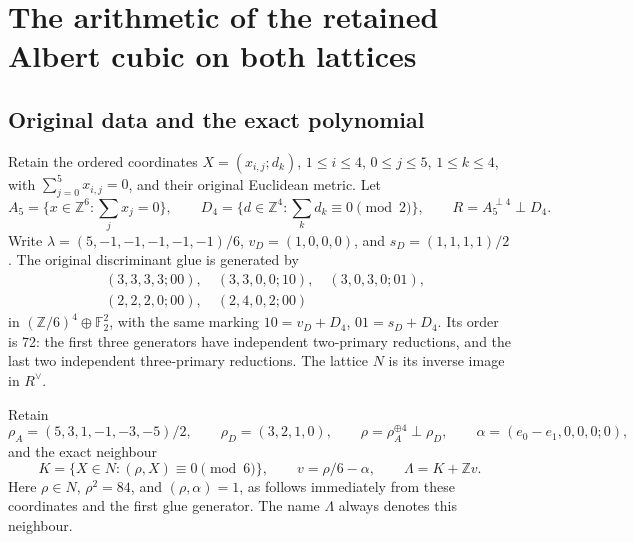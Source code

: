 \section{The arithmetic of the retained Albert cubic on both lattices}
\label{nca:sec:cubic-arithmetic}

\subsection{Original data and the exact polynomial}

Retain the ordered coordinates \(X=(x_{i,j};d_k)\),
\(1\leq i\leq4\), \(0\leq j\leq5\), \(1\leq k\leq4\), with
\(\sum_{j=0}^5x_{i,j}=0\), and their original Euclidean metric.
Let
\[
 A_5=\{x\in\mathbb Z^6:\sum_jx_j=0\},\qquad
 D_4=\{d\in\mathbb Z^4:\sum_kd_k\equiv0\pmod2\},\qquad
 R=A_5^{\perp4}\perp D_4.
\]
Write \(\lambda=(5,-1,-1,-1,-1,-1)/6\),
\(v_D=(1,0,0,0)\), and \(s_D=(1,1,1,1)/2\).
The original discriminant glue is generated by
\[
 \begin{split}
 &(3,3,3,3;00),\quad(3,3,0,0;10),\quad(3,0,3,0;01),\\
 &(2,2,2,0;00),\quad(2,4,0,2;00)
 \end{split}
\]
in \((\mathbb Z/6)^4\oplus\mathbb F_2^2\), with the same marking
\(10=v_D+D_4\), \(01=s_D+D_4\). Its order is 72: the first
three generators have independent two-primary reductions, and the
last two independent three-primary reductions.  The lattice \(N\)
is its inverse image in \(R^\vee\).

Retain
\[
 \rho_A=(5,3,1,-1,-3,-5)/2,\qquad
 \rho_D=(3,2,1,0),\qquad \rho=\rho_A^{\oplus4}\perp\rho_D,
 \qquad \alpha=(e_0-e_1,0,0,0;0),
\]
and the exact neighbour
\[
 K=\{X\in N:(\rho,X)\equiv0\pmod6\},\qquad
 v=\rho/6-\alpha,\qquad \Lambda=K+\mathbb Zv.
\]
Here \(\rho\in N\), \(\rho^2=84\), and \((\rho,\alpha)=1\),
as follows immediately from these coordinates and the first glue
generator.  The name \(\Lambda\) always denotes this neighbour.

